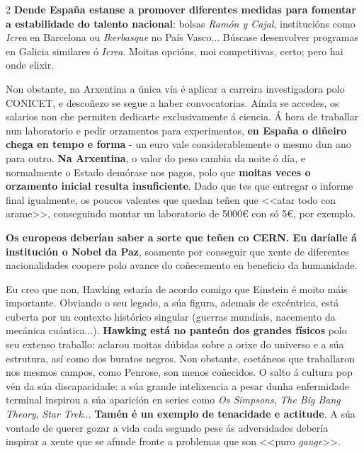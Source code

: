\begin{multicols}{2}
\textbf{Dende España estanse a promover diferentes medidas para fomentar a
estabilidade do talento nacional}: bolsas \emph{Ramón y Cajal}, institucións
como \emph{Icrea} en Barcelona ou \emph{Ikerbasque} no País Vasco... Búscase
desenvolver programas en Galicia similares ó \emph{Icrea}. Moitas opcións, moi
competitivas, certo; pero hai onde elixir.

Non obstante, na Arxentina a única vía é aplicar a carreira investigadora polo
CONICET, e descoñezo se segue a haber convocatorias. Aínda se accedes, os
salarios non che permiten dedicarte exclusivamente á ciencia. Á hora de
traballar nun laboratorio e pedir orzamentos para experimentos, \textbf{en
España o diñeiro chega en tempo e forma} - un euro vale considerablemente o
mesmo dun ano para outro. \textbf{Na Arxentina}, o valor do peso cambia da
noite ó día, e normalmente o Estado demórase nos pagos, polo que \textbf{moitas
veces o orzamento inicial resulta insuficiente}. Dado que tes que entregar o
informe final igualmente, os poucos valentes que quedan teñen que <<atar todo
con arame>>, conseguindo montar un laboratorio de 5000€ con só 5€, por
exemplo.





\textbf{Os europeos deberían saber a sorte que teñen co CERN. Eu daríalle á
institución o Nobel da Paz}, soamente por conseguir que xente de diferentes
nacionalidades coopere polo avance do coñecemento en beneficio da humanidade.





Eu creo que non, Hawking estaría de acordo comigo que Einstein é moito máis
importante. Obviando o seu legado, a súa figura, ademais de excéntrica, está
cuberta por un contexto histórico singular (guerras mundiais, nacemento da
mecánica cuántica...). \textbf{Hawking está no panteón dos grandes físicos}
polo seu extenso traballo: aclarou moitas dúbidas sobre a orixe do universo e a
súa estrutura, así como dos buratos negros. Non obstante, coetáneos que
traballaron nos mesmos campos, como Penrose, son menos coñecidos. O salto á
cultura pop vén da súa discapacidade: a súa grande intelixencia a pesar dunha
enfermidade terminal inspirou a súa aparición en series como \textit{Os
Simpsons}, \textit{The Big Bang Theory}, \textit{Star Trek}... \textbf{Tamén é
un exemplo de tenacidade e actitude}. A súa vontade de querer gozar a vida cada
segundo pese ás adversidades debería inspirar a xente que se afunde fronte a
problemas que son <<puro \emph{gauge}>>.


\end{multicols}
